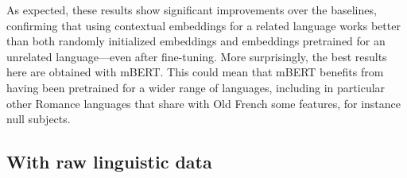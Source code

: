 As expected, these results show significant improvements over the baselines, confirming that using contextual embeddings for a related language works better than both randomly initialized embeddings and embeddings pretrained for an unrelated language---even after fine-tuning.
More surprisingly, the best results here are obtained with mBERT.
This could mean that mBERT benefits from having been pretrained for a wider range of languages, including in particular other Romance languages that share with Old French some features,%
for instance null subjects.

\subsection{With raw linguistic data}\label{sec|withraw}

\begin{table}[ht]
    \centering
    \tablefontsize
    \caption{Results on SRCMF dev — Performances of different model sizes when training from scratch}\label{tab|fromscratch}
\end{table}

